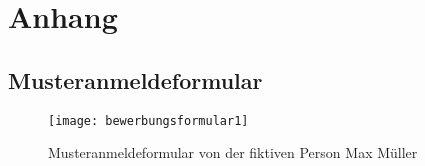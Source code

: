 
\newpage
\section{Anhang}

\subsection{Musteranmeldeformular}
\begin{figure}[H]
    \centering
    \caption{Musteranmeldeformular von der fiktiven Person Max Müller}
    \begin{adjustbox}{height=0.85\textheight, center}
        \texttt{[image: bewerbungsformular1]}
    \end{adjustbox}
\end{figure}

\begin{landscape}


\end{landscape}
